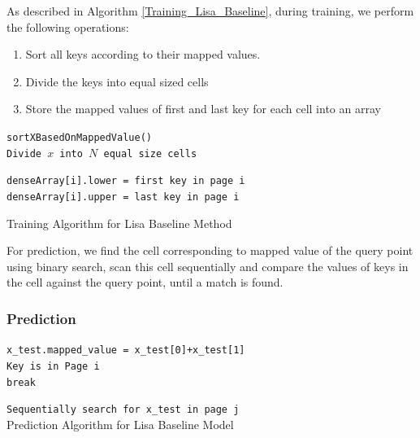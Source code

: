 As described in Algorithm \ref{Training_Lisa_Baseline}, during training, we perform the following operations:

\begin{enumerate}
	\item Sort all keys according to their mapped values.
	\item Divide the keys into equal sized cells
	\item Store the mapped values of first and last key for each cell into an array
\end{enumerate}

\begin{algorithm}[H]
    \SetAlgoLined
     \texttt{sortXBasedOnMappedValue()}\\
     \texttt{Divide $x$ into $N$ equal size cells}\\
     {
         \texttt{denseArray[i].lower = first key in page i  } \\
		 \texttt{denseArray[i].upper = last key in page i  }
		
     }
     \caption{Training Algorithm for Lisa Baseline Method}
     \label{Training_Lisa_Baseline}
\end{algorithm}

For prediction, we find the cell corresponding to mapped value of the query point using binary search, scan this cell sequentially and compare the values of keys in the cell against the query point, until a match is found.

\subsubsection{Prediction}

\begin{algorithm}[H]
    \SetAlgoLined
    \texttt{x\_test.mapped\_value = x\_test[0]+x\_test[1] } \\
    {
        {
		    \texttt{Key is in Page i } \\
		    \texttt{break }
		}
    }
  
 	 \texttt{Sequentially search for x\_test in page j} \\
     \caption{Prediction Algorithm for Lisa Baseline Model }
\end{algorithm}


